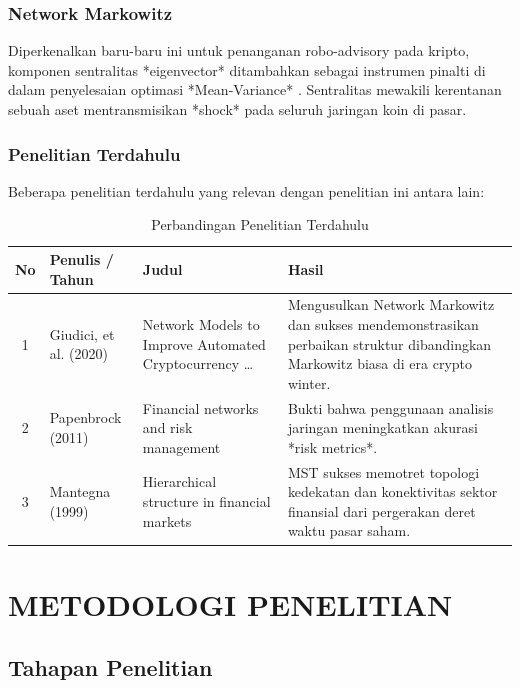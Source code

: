 \documentclass[12pt, a4paper]{report}
\begin{document}
\subsection{Network Markowitz}
Diperkenalkan baru-baru ini untuk penanganan robo-advisory pada kripto, komponen sentralitas *eigenvector* ditambahkan sebagai instrumen pinalti di dalam penyelesaian optimasi *Mean-Variance* \cite{ref1}. Sentralitas mewakili kerentanan sebuah aset mentransmisikan *shock* pada seluruh jaringan koin di pasar.

\subsection{Penelitian Terdahulu}

Beberapa penelitian terdahulu yang relevan dengan penelitian ini antara lain:

\begin{table}[h!]
    \centering
    \caption{Perbandingan Penelitian Terdahulu}
    \label{tab:penelitian_terdahulu}
    \begin{tabularx}{\textwidth}{|c|X|X|X|}
        \hline
        \textbf{No} & \textbf{Penulis / Tahun} & \textbf{Judul} & \textbf{Hasil} \\
        \hline
        1 & Giudici, et al. (2020) & Network Models to Improve Automated Cryptocurrency \dots & Mengusulkan Network Markowitz dan sukses mendemonstrasikan perbaikan struktur dibandingkan Markowitz biasa di era crypto winter. \\
        \hline
        2 & Papenbrock (2011) & Financial networks and risk management & Bukti bahwa penggunaan analisis jaringan meningkatkan akurasi *risk metrics*. \\
        \hline
        3 & Mantegna (1999) & Hierarchical structure in financial markets & MST sukses memotret topologi kedekatan dan konektivitas sektor finansial dari pergerakan deret waktu pasar saham. \\
        \hline
    \end{tabularx}
\end{table}

\chapter{METODOLOGI PENELITIAN}

\section{Tahapan Penelitian}
\end{document}
